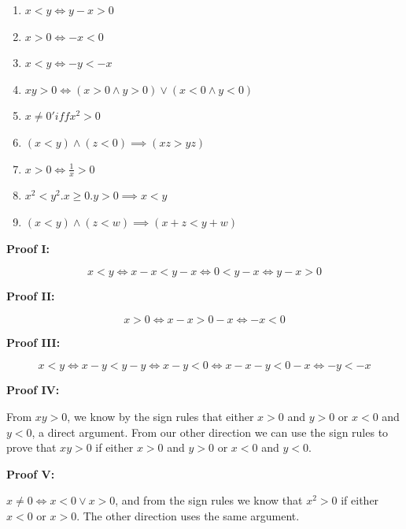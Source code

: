 \begin{enumerate}

	\item \(x < y \iff y - x > 0\)

	\item \(x > 0 \iff -x < 0\)

	\item \(x < y \iff -y < -x\)

	\item \(xy > 0 \iff (x > 0 \land y > 0) \lor (x < 0 \land y < 0)\)

	\item \(x \neq 0 'iff x^2 > 0\)

	\item \((x < y) \land (z < 0) \implies (xz > yz)\)

	\item \(x > 0 \iff \frac{1}{x} > 0\)

	\item \(x^2 < y^2. x \ge 0. y > 0 \implies x < y\)

	\item \((x < y) \land (z < w) \implies (x + z < y + w)\)

\end{enumerate}

\textbf{Proof I:}

\[
	x < y \iff x - x < y - x \iff 0 < y - x \iff y - x > 0
\]

\QED

\textbf{Proof II:}

\[
	x > 0 \iff x - x > 0 - x \iff -x < 0
\]

\QED


\textbf{Proof III:}

\[
	x < y \iff x - y < y - y \iff x - y < 0 \iff x - x  - y < 0 - x \iff -y < -x
\]

\QED


\textbf{Proof IV:}

From \(xy > 0 \), we know by the sign rules that either \(x > 0\) and \(y > 0\) or \(x < 0\) and \(y < 0\), a direct argument.
From our other direction we can use the sign rules to prove that \(xy > 0\) if either \(x > 0\) and \(y > 0\) or \(x < 0\) and \(y < 0\).

\QED

\textbf{Proof V:}

\(x \neq 0 \iff x < 0 \lor x > 0 \), and from the sign rules we know that \(x^2 > 0\) if either \(x < 0\) or \(x > 0\).
The other direction uses the same argument.

